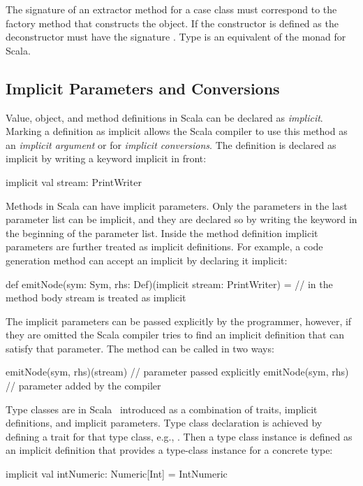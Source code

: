 The signature of an extractor method for a case class must correspond to the factory method that
 constructs the object. If the constructor is defined as 
 the deconstructor must have the signature . Type 
 is an equivalent of the  monad for Scala.


\subsection{Implicit Parameters and Conversions}

Value, object, and method definitions in Scala can be declared as \emph{implicit}. Marking a
definition as implicit allows the Scala compiler to use this method as an \emph{implicit argument} or
for \emph{implicit conversions}. The definition is declared as implicit by writing a keyword implicit in
front:\begin{lstparagraph}
implicit val stream: PrintWriter
\end{lstparagraph}

Methods in Scala can have implicit parameters. Only the parameters in the last parameter list
can be implicit, and they are declared so by writing the keyword  in the beginning
of the parameter list. Inside the method definition implicit parameters are further treated as implicit
definitions. For example, a code generation method can accept an implicit  by declaring it implicit:\begin{lstparagraph}
def emitNode(sym: Sym, rhs: Def)(implicit stream: PrintWriter) = {
// in the method body stream is treated as implicit
}
\end{lstparagraph}

The implicit parameters can be passed explicitly by the programmer, however,
 if they are omitted the Scala compiler tries to find an implicit definition
 that can satisfy that parameter. The  method can be called in two ways:\begin{lstparagraph}
emitNode(sym, rhs)(stream) // parameter passed explicitly
emitNode(sym, rhs)         // parameter added by the compiler
 \end{lstparagraph}

 Type classes are in Scala~\cite{oliveira_type_2010} introduced
 as a combination of traits, implicit definitions, and implicit parameters. Type class declaration
 is achieved by defining a trait for that type class, e.g., . Then a type class
 instance is defined as an implicit definition that provides a type-class instance for
 a concrete type:\begin{lstparagraph}
implicit val intNumeric: Numeric[Int] = IntNumeric
 \end{lstparagraph}

